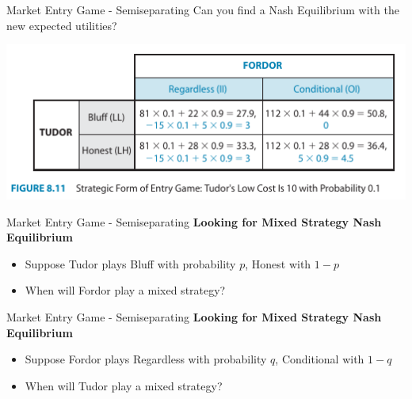 \begin{frame}{Market Entry Game - Semiseparating}
  Can you find a Nash Equilibrium with the new expected utilities? 
  \begin{center}
    \includegraphics[width=1.0\textwidth]{figures/Fig811.png} 
  \end{center}
\end{frame}


\begin{frame}{Market Entry Game - Semiseparating}
  \textbf{Looking for Mixed Strategy Nash Equilibrium} 
  \begin{itemize}
    \item Suppose \alert{Tudor} plays Bluff with probability $p$,
    Honest with $1-p$ 
    \item When will \alert{Fordor} play a mixed strategy?
  \end{itemize}
\end{frame}


\begin{frame}[plain]{}
  
\end{frame}


\begin{frame}{Market Entry Game - Semiseparating}
  \textbf{Looking for Mixed Strategy Nash Equilibrium} 
  \begin{itemize}
    \item Suppose \alert{Fordor} plays Regardless with probability $q$,
    Conditional with $1-q$ 
    \item When will \alert{Tudor} play a mixed strategy?
  \end{itemize}
\end{frame}

